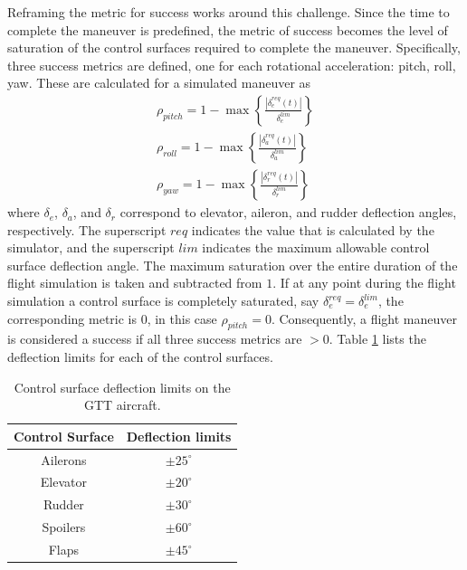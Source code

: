 Reframing the metric for success works around this challenge. 
Since the time to complete the maneuver is predefined, the metric of success becomes the level of saturation of the control surfaces required to complete the maneuver. 
Specifically, three success metrics are defined, one for each rotational acceleration: pitch, roll, yaw. 
These are calculated for a simulated maneuver as
\begin{align}
    \rho_{pitch} = 1- \max\left \{ \frac{\left \vert \delta_e^{req}(t) \right \vert }{\delta_e^{lim}} \right \}
    \\
    \rho_{roll} = 1- \max\left \{ \frac{\left \vert \delta_a^{req}(t) \right \vert }{\delta_a^{lim}} \right \} \label{equ:roll_metric}
    \\
    \rho_{yaw} = 1- \max\left \{ \frac{\left \vert \delta_r^{req}(t) \right \vert }{\delta_r^{lim}} \right \}
\end{align}
where $\delta_e$, $\delta_a$, and $\delta_r$ correspond to elevator, aileron, and rudder deflection angles, respectively.
The superscript $req$ indicates the value that is calculated by the simulator, and the superscript $lim$ indicates the maximum allowable control surface deflection angle. 
The maximum saturation over the entire duration of the flight simulation is taken and subtracted from $1$.
If at any point during the flight simulation a control surface is completely saturated, say $\delta_e^{req} = \delta_e^{lim}$, the corresponding metric is $0$, in this case $\rho_{pitch} = 0$.
Consequently, a flight maneuver is considered a success if all three success metrics are $>0$.
Table \ref{tab:gtt_defl_limits} lists the deflection limits for each of the control surfaces.

\begin{table}
\centering
    \renewcommand{\arraystretch}{1.2}
    \captionsetup{justification=centering}
    \caption{Control surface deflection limits on the GTT aircraft.} 
    \begin{tabular}{|c|c|}
    \hline
        Control Surface & Deflection limits \\ \hline
        Ailerons & $\pm 25^\circ$ \\ \hline
        Elevator & $\pm 20^\circ$ \\ \hline
        Rudder & $\pm 30^\circ$ \\ \hline
        Spoilers & $\pm 60^\circ$ \\ \hline
        Flaps & $\pm 45^\circ$ \\ \hline
    \end{tabular}
    \label{tab:gtt_defl_limits}
\end{table}

